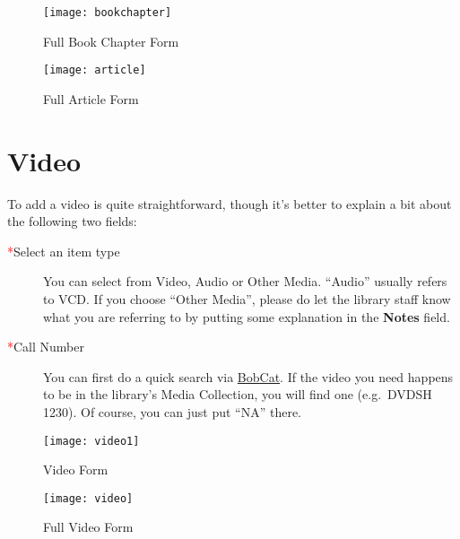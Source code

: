 \clearpage
\begin{figure}[h]
    \centering
    \texttt{[image: bookchapter]}
    \caption{Full Book Chapter Form}
    \label{fig: chapter form}
\end{figure}
\clearpage

\clearpage
\begin{figure}[h]
    \centering
    \texttt{[image: article]}
    \caption{Full Article Form}
    \label{fig: article form}
\end{figure}
\clearpage



\section{Video}
\label{sec:video}
To add a video is quite straightforward, though it's better to explain a bit about the following two fields:
\begin{description}
    \item[\textcolor{red}{*}Select an item type] You can select from Video, Audio or Other Media. ``Audio'' usually refers to VCD. If you choose ``Other Media'', please do let the library staff know what you are referring to by putting some explanation in the \textbf{Notes} field.
    \item[\textcolor{red}{*}Call Number] You can first do a quick search via \href{https://shanghai.nyu.edu/academics/library}{BobCat}. If the video you need happens to be in the library's Media Collection, you will find one (e.g.\ DVDSH 1230). Of course, you can just put ``NA'' there. 
\end{description}

\vspace*{5ex}
\begin{figure}[h]
    \centering
    \texttt{[image: video1]}
    \caption{Video Form}
    \label{fig:videoform}
\end{figure}


\clearpage
\begin{figure}[h]
    \centering
    \texttt{[image: video]}
    \caption{Full Video Form}
    \label{fig: video form}
\end{figure}
\clearpage

